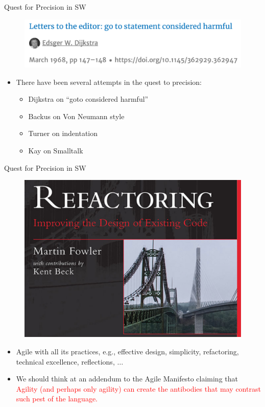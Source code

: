 \documentclass{beamer}
\begin{document}
\begin{frame}
{\centerline{Quest for Precision in SW}}
\begin{figure}[htp]
    \centering
     \includegraphics[width=.95\textwidth]{P2023.AIBCCSS.StoryTelling/GoToConsideredHarmful.png}
    \label{F:GoToConsideredHarmful}
\end{figure}
\vspace{-0.1cm}

\begin{itemize}
\item There have been several attempts in the quest to precision:
\begin{itemize}
\item Dijkstra on ``goto considered harmful''
\item Backus on Von Neumann style
\item Turner on indentation
\item Kay on Smalltalk
\end{itemize}
\end{itemize}



\end{frame}

\begin{frame}
{\centerline{Quest for Precision in SW}}
\begin{figure}[htp]
    \centering
     \includegraphics[width=.55\textwidth]{P2023.AIBCCSS.StoryTelling/Refactoring.png}
    \label{F:Refactoring}
\end{figure}
\vspace{-0.1cm}

\begin{itemize}
\item Agile with all its practices, e.g., effective design, simplicity,  refactoring, technical excellence, reflections, $\ldots{}$
\item We should think at an addendum to the Agile Manifesto claiming that \textcolor{red}{Agility (and perhaps only agility) can create the antibodies that may contrast such pest of the language.}
\end{itemize}



\end{frame}
\end{document}
